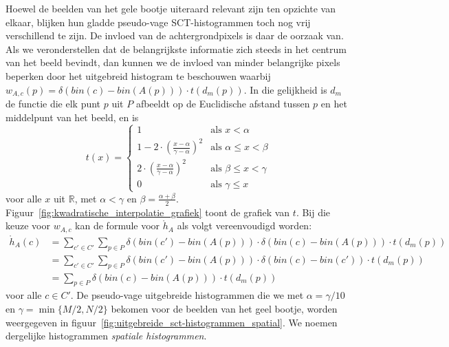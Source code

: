 Hoewel de beelden van het gele bootje uiteraard relevant zijn ten
opzichte van elkaar, blijken hun gladde pseudo-vage SCT-histogrammen toch nog vrij verschillend 
te zijn. De invloed van de achtergrondpixels is daar de oorzaak van. Als we veronderstellen dat
de belangrijkste informatie zich steeds in het centrum van het beeld bevindt, dan kunnen we
de invloed van minder belangrijke pixels beperken door het uitgebreid histogram te beschouwen waarbij
$w_{A,c}(p)=\delta(bin(c)-bin(A(p))) \cdot t(d_m(p))$. In die gelijkheid is $d_m$ de functie die 
elk punt $p$ uit $P$ afbeeldt op de Euclidische afstand tussen $p$ en het middelpunt van het beeld, 
en is
\begin{displaymath}
t(x) = \begin{cases}
1 & \textrm{als } x < \alpha \\
1 - 2 \cdot \left( \frac{x-\alpha}{\gamma - \alpha} \right)^2 & \textrm{als } \alpha \le x < \beta \\[6pt]
2 \cdot \left( \frac{x-\alpha}{\gamma - \alpha} \right)^2 & \textrm{als } \beta \le x < \gamma \\
0 & \textrm{als } \gamma \le x
\end{cases}
\end{displaymath}
voor alle $x$ uit $\mathbb{R}$, met $\alpha < \gamma$ en $\beta=\frac{\alpha + \beta}{2}$. 
Figuur~\ref{fig:kwadratische_interpolatie_grafiek} toont de grafiek van $t$. Bij
die keuze voor $w_{A,c}$ kan de formule voor $\mathring{h}_A$ als volgt vereenvoudigd worden:
\begin{align*}
\mathring{h}_A(c)
 & = \displaystyle \sum_{c' \in C'} \sum_{p \in P} \delta (bin(c')-bin(A(p))) \cdot \delta (bin(c)-bin(A(p))) \cdot t(d_m(p)) \\
 & = \displaystyle \sum_{c' \in C'} \sum_{p \in P} \delta (bin(c')-bin(A(p))) \cdot \delta (bin(c)-bin(c')) \cdot t(d_m(p)) \\
 & = \displaystyle \sum_{p \in P} \delta (bin(c)-bin(A(p))) \cdot t(d_m(p))
\end{align*}
voor alle $c \in C'$. De pseudo-vage uitgebreide
histogrammen die we met $\alpha=\gamma / 10$ en $\gamma = \min\{M/2, N/2\}$ bekomen voor de beelden 
van het geel bootje, worden weergegeven in
figuur~\ref{fig:uitgebreide_sct-histogrammen_spatial}. We noemen dergelijke histogrammen
\emph{spatiale histogrammen}.

